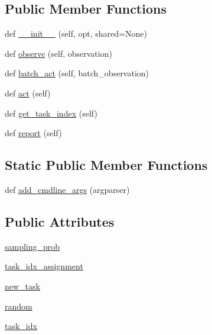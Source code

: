 \subsection*{Public Member Functions}
\begin{DoxyCompactItemize}
\item 
def \hyperlink{classparlai_1_1tasks_1_1self__feeding_1_1agents_1_1SelfFeedingMTLTeacher_a422eb4bb783b661fb071405964faa27b}{\+\_\+\+\_\+init\+\_\+\+\_\+} (self, opt, shared=None)
\item 
def \hyperlink{classparlai_1_1tasks_1_1self__feeding_1_1agents_1_1SelfFeedingMTLTeacher_a6028394bf25ea9ae027bcf59a302a72c}{observe} (self, observation)
\item 
def \hyperlink{classparlai_1_1tasks_1_1self__feeding_1_1agents_1_1SelfFeedingMTLTeacher_ab27a186b935f2194fb38e56bfe14b86c}{batch\+\_\+act} (self, batch\+\_\+observation)
\item 
def \hyperlink{classparlai_1_1tasks_1_1self__feeding_1_1agents_1_1SelfFeedingMTLTeacher_ac4ee43a50c54d2033be6eb5731650ab3}{act} (self)
\item 
def \hyperlink{classparlai_1_1tasks_1_1self__feeding_1_1agents_1_1SelfFeedingMTLTeacher_a19777439481c688e85f355802ff4a791}{get\+\_\+task\+\_\+index} (self)
\item 
def \hyperlink{classparlai_1_1tasks_1_1self__feeding_1_1agents_1_1SelfFeedingMTLTeacher_a2edc59dcf9cae5a9d9c58f955c52d749}{report} (self)
\end{DoxyCompactItemize}
\subsection*{Static Public Member Functions}
\begin{DoxyCompactItemize}
\item 
def \hyperlink{classparlai_1_1tasks_1_1self__feeding_1_1agents_1_1SelfFeedingMTLTeacher_a7e8b6a7c6d8d05a46e0ed6da2b0988cb}{add\+\_\+cmdline\+\_\+args} (argparser)
\end{DoxyCompactItemize}
\subsection*{Public Attributes}
\begin{DoxyCompactItemize}
\item 
\hyperlink{classparlai_1_1tasks_1_1self__feeding_1_1agents_1_1SelfFeedingMTLTeacher_acdd93c4e8e79cc6e609709e2c8cae87e}{sampling\+\_\+prob}
\item 
\hyperlink{classparlai_1_1tasks_1_1self__feeding_1_1agents_1_1SelfFeedingMTLTeacher_a7a63c46aea820d9d59650ea447417b60}{task\+\_\+idx\+\_\+assignment}
\item 
\hyperlink{classparlai_1_1tasks_1_1self__feeding_1_1agents_1_1SelfFeedingMTLTeacher_affab31c63e5fd885ebd2be70aa6fb945}{new\+\_\+task}
\item 
\hyperlink{classparlai_1_1tasks_1_1self__feeding_1_1agents_1_1SelfFeedingMTLTeacher_adb760b673e0b9218a3e5f2c142373f23}{random}
\item 
\hyperlink{classparlai_1_1tasks_1_1self__feeding_1_1agents_1_1SelfFeedingMTLTeacher_a355293f82aaba94d2db593fd836de9dd}{task\+\_\+idx}
\end{DoxyCompactItemize}


